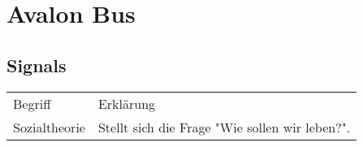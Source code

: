 \section{Avalon Bus}
	\subsection{Signals}
	
		\begin{longtable}{|p{}||p{}|}
			\hline
			Begriff
				& Erklärung\\
			\hhline{|=#=|}
			Sozialtheorie
				& Stellt sich die Frage "Wie sollen wir leben?".\\
			\hline
		\end{longtable}
